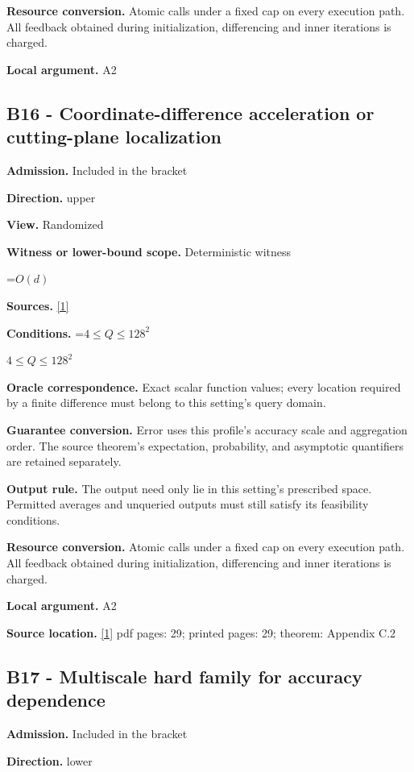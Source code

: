 \documentclass[10pt,a4paper]{article}
\newcommand{\AtlasMath}[1]{\par\begingroup\centering\setbox0=\hbox{$\displaystyle #1$}\ifdim\wd0>1.4\linewidth\typeout{ATLAS WIDE FORMULA: \the\wd0}\fi\ifdim\wd0>\linewidth\resizebox{\linewidth}{!}{\box0}\else\box0\fi\par\endgroup}
\newcommand{\AtlasInlineMath}[1]{\begingroup\setbox0=\hbox{$#1$}\ifdim\wd0>.4\linewidth\endgroup\AtlasMath{#1}\else\endgroup$#1$\fi}
\begin{document}
\textbf{Resource conversion.} Atomic calls under a fixed cap on every execution path. All feedback obtained during initialization, differencing and inner iterations is charged.

\textbf{Local argument.} A2

\subsection{B16 - Coordinate-difference acceleration or cutting-plane localization}
\textbf{Admission.} Included in the bracket

\textbf{Direction.} upper

\textbf{View.} Randomized

\textbf{Witness or lower-bound scope.} Deterministic witness

\AtlasMath{O(d)}
\textbf{Sources.} \href{https://arxiv.org/html/2610.00345v1}{[1]}

\textbf{Conditions.} \AtlasInlineMath{4\le Q\le128^2}

\textbf{Oracle correspondence.} Exact scalar function values; every location required by a finite difference must belong to this setting's query domain.

\textbf{Guarantee conversion.} Error uses this profile's accuracy scale and aggregation order. The source theorem's expectation, probability, and asymptotic quantifiers are retained separately.

\textbf{Output rule.} The output need only lie in this setting's prescribed space. Permitted averages and unqueried outputs must still satisfy its feasibility conditions.

\textbf{Resource conversion.} Atomic calls under a fixed cap on every execution path. All feedback obtained during initialization, differencing and inner iterations is charged.

\textbf{Local argument.} A2

\textbf{Source location.} \href{https://arxiv.org/html/2610.00345v1}{[1]} pdf pages: 29; printed pages: 29; theorem: Appendix C.2

\subsection{B17 - Multiscale hard family for accuracy dependence}
\textbf{Admission.} Included in the bracket

\textbf{Direction.} lower
\end{document}
